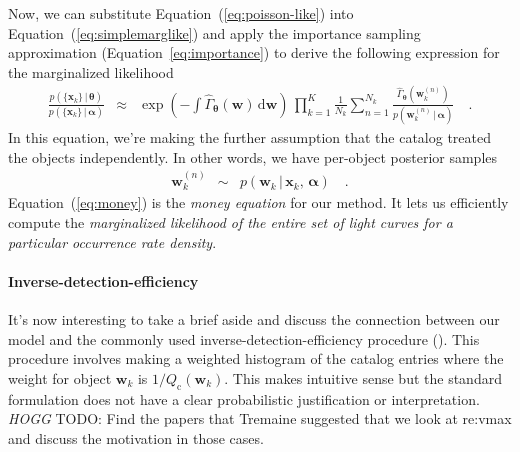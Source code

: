 \documentclass[12pt,preprint]{aastex}
\newcommand{\Eq}[1]{Equation~(\ref{eq:#1})}
\newcommand{\eq}[1]{\Eq{#1}}
\newcommand{\eqalt}[1]{Equation~\ref{eq:#1}}
\newcommand{\eqlabel}[1]{\label{eq:#1}}
\newcommand{\dd}{\ensuremath{\,\mathrm{d}}}
\newcommand{\bvec}[1]{\ensuremath{\boldsymbol{#1}}}
\newcommand{\todo}[3]{{\color{#2} \emph{#1} TODO: #3}}
\newcommand{\hoggtodo}[1]{\todo{HOGG}{blue}{#1}}
\newcommand{\rate}{\ensuremath{\Gamma}}
\newcommand{\ratepar}{{\ensuremath{\theta}}}
\newcommand{\ratepars}{{\ensuremath{\bvec{\ratepar}}}}
\newcommand{\obs}[1]{\ensuremath{\hat{#1}}}
\newcommand{\completeness}{{\ensuremath{Q_\mathrm{c}}}}
\newcommand{\data}{{\ensuremath{\bvec{x}}}}
\newcommand{\entry}{{\ensuremath{\bvec{w}}}}
\newcommand{\interim}{{\ensuremath{\bvec{\alpha}}}}
\begin{document}
Now, we can substitute \eq{poisson-like} into \eq{simplemarglike} and apply
the importance sampling approximation (\eqalt{importance}) to derive the
following expression for the marginalized likelihood
\begin{eqnarray}\eqlabel{money}
\frac{p(\{\data_k\}\,|\,\ratepars)}{p(\{\data_k\}\,|\,\interim)} &\approx&
    \exp\left(-\int \obs{\rate}_\ratepars (\entry) \dd\entry\right) \,
    \prod_{k=1}^K
    \frac{1}{N_k} \sum_{n=1}^{N_k}
    \frac{\obs{\rate}_\ratepars (\entry_k^{(n)})}
         {p(\entry_k^{(n)}\,|\,\interim)} \quad.
\end{eqnarray}
In this equation, we're making the further assumption that the catalog treated
the objects independently.
In other words, we have per-object posterior samples
\begin{eqnarray}
\entry_k^{(n)} &\sim& p(\entry_k\,|\,\data_k,\,\interim) \quad.
\end{eqnarray}
\Eq{money} is the \emph{money equation} for our method.
It lets us efficiently compute the \emph{marginalized likelihood of the entire
set of light curves for a particular occurrence rate density}.

\paragraph{Inverse-detection-efficiency}
It's now interesting to take a brief aside and discuss the connection between
our model and the commonly used inverse-detection-efficiency procedure
(\citealt{howard,dressing,petigura}).
This procedure involves making a weighted histogram of the catalog entries
where the weight for object $\entry_k$ is $1/\completeness(\entry_k)$.
This makes intuitive sense but the standard formulation does not have a clear
probabilistic justification or interpretation.
\hoggtodo{Find the papers that Tremaine suggested that we look at re:vmax and
discuss the motivation in those cases.}
\end{document}
